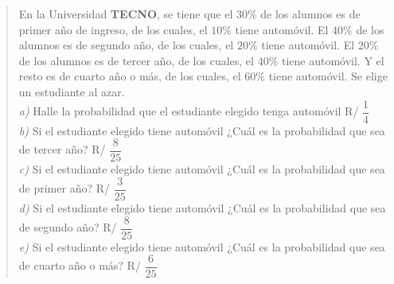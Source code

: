 \documentclass[11pt]{article}
\begin{document}
\begin{quote}
En la Universidad \textbf{TECNO}, se tiene que el $30\%$ de los alumnos es de primer año de ingreso, de los cuales, el $10\%$ tiene automóvil. El $40\%$ de los alumnos es de segundo año, de los cuales, el $20\%$ tiene automóvil. El $20\%$ de los alumnos es de tercer año, de los cuales, el $40\%$ tiene automóvil. Y el resto es de cuarto año o más, de los cuales, el $60\%$ tiene automóvil. Se elige un estudiante al azar.\\
\emph{a)} Halle la probabilidad que el estudiante elegido tenga automóvil \hfill R/ $\dfrac14$\\
\emph{b)} Si el estudiante elegido tiene automóvil ¿Cuál es la probabilidad que sea de tercer año? \hfill R/ $\dfrac{8}{25}$\\
\emph{c)} Si el estudiante elegido tiene automóvil ¿Cuál es la probabilidad que sea de primer año? \hfill R/ $\dfrac{3}{25}$\\
\emph{d)} Si el estudiante elegido tiene automóvil ¿Cuál es la probabilidad que sea de segundo año? \hfill R/ $\dfrac{8}{25}$\\
\emph{e)} Si el estudiante elegido tiene automóvil ¿Cuál es la probabilidad que sea de cuarto año o más? \hfill R/ $\dfrac{6}{25}$
\end{quote}
\end{document}
